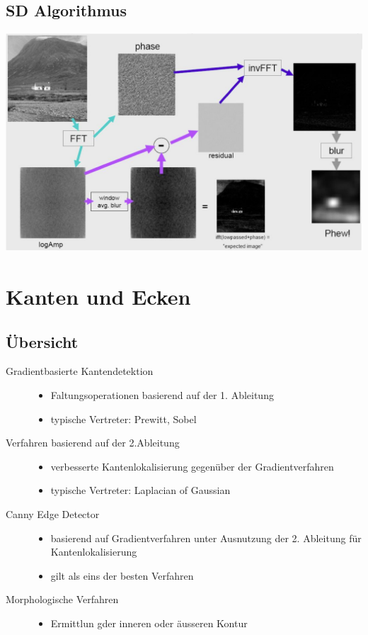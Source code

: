 \documentclass[10pt]{article}
\begin{document}
\subsection{SD Algorithmus}
\begin{center}
	\includegraphics[scale=0.4]{sd-alg.png}
\end{center}

\pagebreak
\section{Kanten und Ecken}
\subsection{Übersicht}
\begin{description}
	\item[Gradientbasierte Kantendetektion] \hfill
		\begin{itemize}
			\item Faltungsoperationen basierend auf der 1. Ableitung
			\item typische Vertreter: Prewitt, Sobel
		\end{itemize}
	\item[Verfahren basierend auf der 2.Ableitung] \hfill
		\begin{itemize}
			\item verbesserte Kantenlokalisierung gegenüber der Gradientverfahren
			\item typische Vertreter: Laplacian of Gaussian
		\end{itemize}
	\item[Canny Edge Detector] \hfill
		\begin{itemize}
			\item basierend auf Gradientverfahren unter Ausnutzung der 2. Ableitung für Kantenlokalisierung
			\item gilt als eins der besten Verfahren
		\end{itemize}
	\item[Morphologische Verfahren] \hfill
		\begin{itemize}
			\item Ermittlun gder inneren oder äusseren Kontur
		\end{itemize}
\end{description}
\end{document}
